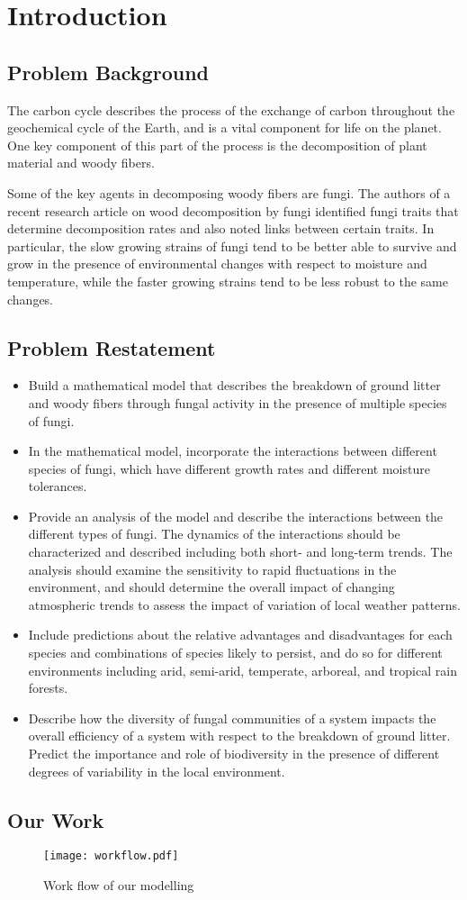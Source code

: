 \section{Introduction}\label{sec:intro}

\subsection{Problem Background}

The carbon cycle describes the process of the exchange of carbon throughout the geochemical cycle of the Earth, and is a vital component for life on the planet. One key component of this part of the process is the decomposition of plant material and woody fibers.

Some of the key agents in decomposing woody fibers are fungi. The authors of a recent research article on wood decomposition by fungi identified fungi traits that determine decomposition rates and also noted links between certain traits. In particular, the slow growing strains of fungi tend to be better able to survive and grow in the presence of environmental changes with respect to moisture and temperature, while the faster growing strains tend to be less robust to the same changes.

\subsection{Problem Restatement}
\begin{itemize}
\item Build a mathematical model that describes the breakdown of ground litter and woody fibers through fungal activity in the presence of multiple species of fungi.
\item In the mathematical model, incorporate the interactions between different species of fungi, which have different growth rates and different moisture tolerances.
\item Provide an analysis of the model and describe the interactions between the different types of fungi. The dynamics of the interactions should be characterized and described including both short- and long-term trends. The analysis should examine the sensitivity to rapid fluctuations in the environment, and should determine the overall impact of changing atmospheric trends to assess the impact of variation of local weather patterns.
\item Include predictions about the relative advantages and disadvantages for each species and combinations of species likely to persist, and do so for different environments including arid, semi-arid, temperate, arboreal, and tropical rain forests.
\item Describe how the diversity of fungal communities of a system impacts the overall efficiency of a system with respect to the breakdown of ground litter. Predict the importance and role of biodiversity in the presence of different degrees of variability in the local environment.
\end{itemize}
\subsection{Our Work}

\begin{figure}\caption{Work flow of our modelling}
    \begin{center}
        \texttt{[image: workflow.pdf]}
    \end{center}\end{figure}
